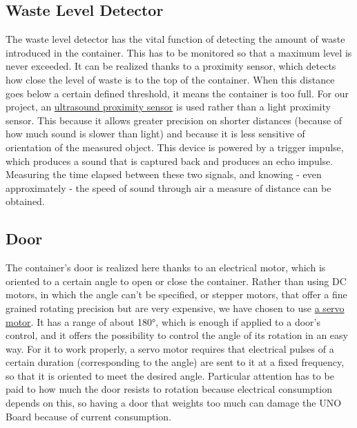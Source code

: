 \documentclass[a4paper,12pt]{report}
\begin{document}
	\subsection{Waste Level Detector}
	The waste level detector has the vital function of detecting the amount of waste introduced in the container. This has to be monitored so that a maximum level is never exceeded.\newline
	It can be realized thanks to a proximity sensor, which detects how close the level of waste is to the top of the container. When this distance goes below a certain defined threshold, it means the container is too full. For our project, an \href{https://docs.google.com/document/d/1Y-yZnNhMYy7rwhAgyL_pfa39RsB-x2qR4vP8saG73rE/edit?tab=t.0}{ultrasound proximity sensor} is used rather than a light proximity sensor. This because it allows greater precision on shorter distances (because of how much sound is slower than light) and because it is less sensitive of orientation of the measured object. This device is powered by a trigger impulse, which produces a sound that is captured back and produces an echo impulse. Measuring the time elapsed between these two signals, and knowing - even approximately - the speed of sound through air a measure of distance can be obtained.
	
	\subsection{Door}
	The container's door is realized here thanks to an electrical motor, which is oriented to a certain angle to open or close the container.\newline
	Rather than using DC motors, in which the angle can't be specified, or stepper motors, that offer a fine grained rotating precision but are very expensive, we have chosen to use \href{https://www.kjell.com/globalassets/mediaassets/701916_87897_datasheet_en.pdf?ref=4287817A7A}{a servo motor}. It has a range of about 180°, which is enough if applied to a door's control, and it offers the possibility to control the angle of its rotation in an easy way. For it to work properly, a servo motor requires that electrical pulses of a certain duration (corresponding to the angle) are sent to it at a fixed frequency, so that it is oriented to meet the desired angle. Particular attention has to be paid to how much the door resists to rotation because electrical consumption depends on this, so having a door that weights too much can damage the UNO Board because of current consumption.
	
\end{document}
